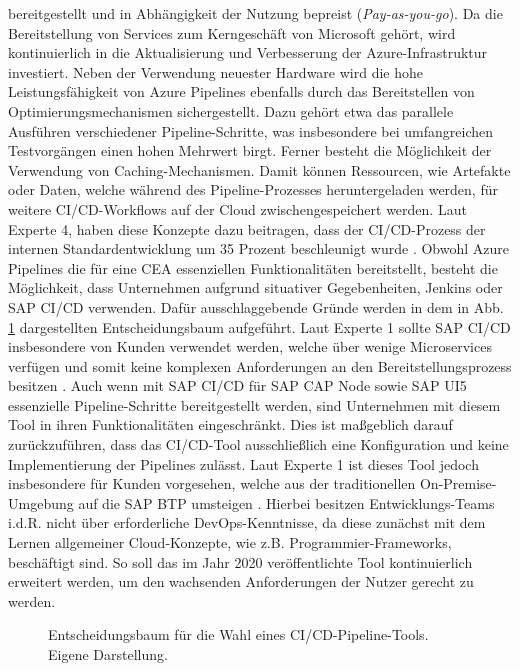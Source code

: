 bereitgestellt und in Abhängigkeit der Nutzung bepreist (\textit{Pay-as-you-go}). Da die Bereitstellung von Services zum Kerngeschäft von Microsoft gehört, wird kontinuierlich in die Aktualisierung und Verbesserung der Azure-Infrastruktur investiert. Neben der Verwendung neuester Hardware wird die hohe Leistungsfähigkeit von Azure Pipelines ebenfalls durch das Bereitstellen von Optimierungsmechanismen sichergestellt. Dazu gehört etwa das parallele Ausführen verschiedener Pipeline-Schritte, was insbesondere bei umfangreichen Testvorgängen einen hohen Mehrwert birgt. Ferner besteht die Möglichkeit der Verwendung von Caching-Mechanismen. Damit können Ressourcen, wie Artefakte oder Daten, welche während des Pipeline-Prozesses heruntergeladen werden, für weitere CI/CD-Workflows  auf der Cloud zwischengespeichert werden. Laut Experte 4, haben diese Konzepte dazu beitragen, dass der CI/CD-Prozess der internen Standardentwicklung um 35 Prozent beschleunigt wurde \cite[Z. 58 ff.]{TestDeveloperSAPHyperspaceAdoption&Onboarding.}. Obwohl Azure Pipelines die für eine CEA essenziellen Funktionalitäten bereitstellt, besteht die Möglichkeit, dass Unternehmen aufgrund situativer Gegebenheiten, Jenkins oder SAP CI/CD verwenden. Dafür ausschlaggebende Gründe werden in dem in Abb. \ref{fig:Entscheidungsbaum} dargestellten Entscheidungsbaum aufgeführt.
Laut Experte 1 sollte SAP CI/CD insbesondere von Kunden verwendet werden, welche über wenige Microservices verfügen und somit keine komplexen Anforderungen an den Bereitstellungsprozess besitzen \cite[Z. 58 ff.]{ProductOwnerSAPBTPProd&Infra.}. Auch wenn mit SAP CI/CD für SAP CAP Node sowie SAP UI5 essenzielle Pipeline-Schritte bereitgestellt werden, sind Unternehmen mit diesem Tool in ihren Funktionalitäten eingeschränkt. Dies ist maßgeblich darauf zurückzuführen, dass das CI/CD-Tool ausschließlich eine Konfiguration und keine Implementierung der Pipelines zulässt. 
Laut Experte 1 ist dieses Tool jedoch insbesondere für Kunden vorgesehen, welche aus der traditionellen On-Premise-Umgebung auf die SAP BTP umsteigen \cite[Z. 58 ff.]{ProductOwnerSAPBTPProd&Infra.}. Hierbei besitzen Entwicklungs-Teams i.d.R. nicht über erforderliche DevOps-Kenntnisse, da diese zunächst mit dem Lernen allgemeiner Cloud-Konzepte, wie z.B. Programmier-Frameworks, beschäftigt sind. So soll das im Jahr 2020 veröffentlichte Tool kontinuierlich erweitert werden, um den wachsenden Anforderungen der Nutzer gerecht zu werden. 
\begin{center}
	\begin{figure}[H]\hspace*{-5mm}\hspace*{-11mm}
		\centering
		\caption[Entscheidungsbaum für die Wahl eines CI/CD-Pipeline-Tools]{Entscheidungsbaum für die Wahl eines CI/CD-Pipeline-Tools. Eigene Darstellung.}
		\label{fig:Entscheidungsbaum}
	\end{figure}
\end{center}
